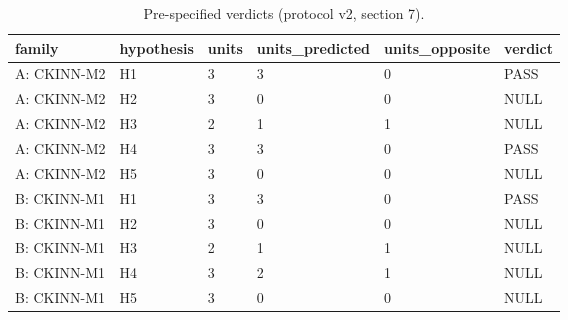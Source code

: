 \begin{table}[ht]
\centering
\scriptsize
\caption{Pre-specified verdicts (protocol v2, section 7).}
\label{tab:verdicts}
\begin{tabular}{llllll}
\toprule
family & hypothesis & units & units\_predicted & units\_opposite & verdict \\
\midrule
A: CKINN-M2 & H1 & 3 & 3 & 0 & PASS \\
A: CKINN-M2 & H2 & 3 & 0 & 0 & NULL \\
A: CKINN-M2 & H3 & 2 & 1 & 1 & NULL \\
A: CKINN-M2 & H4 & 3 & 3 & 0 & PASS \\
A: CKINN-M2 & H5 & 3 & 0 & 0 & NULL \\
B: CKINN-M1 & H1 & 3 & 3 & 0 & PASS \\
B: CKINN-M1 & H2 & 3 & 0 & 0 & NULL \\
B: CKINN-M1 & H3 & 2 & 1 & 1 & NULL \\
B: CKINN-M1 & H4 & 3 & 2 & 1 & NULL \\
B: CKINN-M1 & H5 & 3 & 0 & 0 & NULL \\
\bottomrule
\end{tabular}
\end{table}
